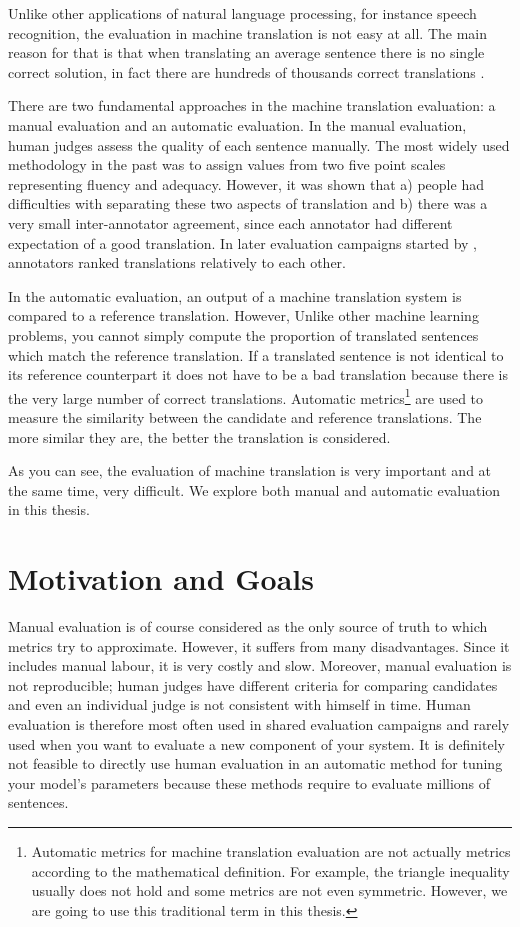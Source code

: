 Unlike other applications of natural language processing, for instance speech
recognition, the evaluation in machine translation is not easy at all. The main
reason for that is that when translating an average sentence there is no single
correct solution, in fact there are hundreds of thousands correct translations
.

There are two fundamental approaches in the machine translation evaluation: a
manual evaluation and an automatic evaluation.  In the manual evaluation, human
judges assess the quality of each sentence manually. The most widely used
methodology in the past was to assign values from two five point scales
representing fluency and adequacy. However, it was shown that a) people had
difficulties with separating these two aspects of translation and b) there was
a very small inter-annotator agreement, since each annotator had different
expectation of a good translation. In later evaluation campaigns started by
, annotators ranked translations relatively 
to each other.

In the automatic evaluation, an output of a machine translation system is
compared to a reference translation. However, Unlike other machine learning
problems, you cannot simply compute the proportion of translated sentences
which match the reference translation. If a translated sentence is not
identical to its reference counterpart it does not have to be a bad translation
because there is the very large number of correct translations. Automatic
metrics\footnote{Automatic metrics for machine translation evaluation are not
actually metrics according to the mathematical definition. For example, the
triangle inequality usually does not hold and some metrics are not even
symmetric. However, we are going to use this traditional term in this thesis.}
are used to measure the similarity between the candidate and reference
translations. The more similar they are, the better the translation is
considered.

As you can see, the evaluation of machine translation is very important and at
the same time, very difficult. We explore both manual and automatic evaluation
in this thesis.

\section{Motivation and Goals}

Manual evaluation is of course considered as the only source of truth to which
metrics try to approximate. However, it suffers from many disadvantages. Since
it includes manual labour, it is very costly and slow. Moreover, manual
evaluation is not reproducible; human judges have different criteria for
comparing candidates and even an individual judge is not consistent with
himself in time. Human evaluation is therefore most often used in shared
evaluation campaigns and rarely used when you want to evaluate a new component
of your system. It is definitely not feasible to directly use human evaluation
in an automatic method for tuning your model's parameters because these methods
require to evaluate millions of sentences.

